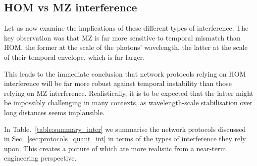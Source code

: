 \subsection{HOM vs MZ interference} 

Let us now examine the implications of these different types of interference. The key observation was that MZ is far more sensitive to temporal mismatch than HOM, the former at the scale of the photons' wavelength, the latter at the scale of their temporal envelope, which is far larger.

This leads to the immediate conclusion that network protocols relying on HOM interference will be far more robust against temporal instability than those relying on MZ interference. Realistically, it is to be expected that the latter might be impossibly challenging in many contexts, as wavelength-scale stabilisation over long distances seems implausible.

In Table.~\ref{table:summary_inter} we summarise the network protocols discussed in Sec.~\ref{sec:protocols_quant_int} in terms of the types of interference they rely upon. This creates a picture of which are more realistic from a near-term engineering perspective.

